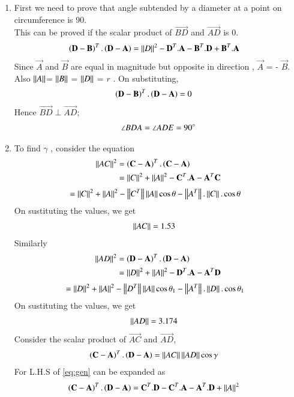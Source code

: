 \renewcommand{\theequation}{\theenumi}
\begin{enumerate}[label=\thesection.\arabic*.,ref=\thesection.\theenumi]

\item First we need to prove that angle subtended by a diameter at a point on circumference is 90\degree. \\
This can be proved if the scalar product of $\vec{BD}$ and $\vec{AD}$ is 0.
\begin{align}
\left(\mathbf{D}-\mathbf{B}\right)^T.\left(\mathbf{D}-\mathbf{A}\right) &= \left\lVert D\right\rVert^2 - \mathbf{D}^T.\mathbf{A} - \mathbf{B}^T.\mathbf{D} + \mathbf{B}^T.\mathbf{A}
\end{align}
Since $\vec{A}$ and $\vec{B}$ are equal in magnitude but opposite in direction , $\vec{A}$ = - $\vec{B}$. Also $\left\lVert A\right\rVert$= $\left\lVert B\right\rVert$ = $\left\lVert D\right\rVert$ = $r$ . On substituting,
\begin{align}
 \left(\mathbf{D}-\mathbf{B}\right)^T.\left(\mathbf{D}-\mathbf{A}\right) &= 0
\end{align}
Hence $\vec{BD} \perp \vec{AD}$; 
\begin{align}
\angle BDA = \angle ADE = 90\degree
\label{eq:angleADE}
\end{align}

\item To find $\gamma$ ,
consider the equation
\begin{align}
\left\lVert AC\right\rVert^2 &=  \left(\mathbf{C} - \mathbf{A}\right)^T. \left(\mathbf{C} - \mathbf{A}\right) \\
 &= \left\lVert C\right\rVert^2 + \left\lVert A\right\rVert^2  - \mathbf{C}^T.\mathbf{A} - \mathbf{A}^T\mathbf{C} 
\end{align}
\begin{align}
 &= \left\lVert C\right\rVert^2 + \left\lVert A\right\rVert^2 - \left\lVert C^T\right\rVert\left\lVert A\right\rVert\cos\theta - \left\lVert A^T\right\rVert.\left\lVert C\right\rVert.\cos\theta
\end{align}
On sustituting the values, we get 
\begin{align}
\left\lVert AC\right\rVert &= 1.53
\label{eq:AC}
\end{align}
Similarly 
\begin{align}
\left\lVert AD\right\rVert^2 &= \left(\mathbf{D} - \mathbf{A}\right)^T.\left(\mathbf{D} - \mathbf{A}\right) \\
 &= \left\lVert D\right\rVert^2 + \left\lVert A\right\rVert^2  - \mathbf{D}^T.\mathbf{A} - \mathbf{A}^T\mathbf{D} 
\end{align}
\begin{align}
 &= \left\lVert D\right\rVert^2 + \left\lVert A\right\rVert^2 - \left\lVert D^T\right\rVert\left\lVert A\right\rVert\cos\theta_1 - \left\lVert A^T\right\rVert.\left\lVert D\right\rVert.\cos\theta_1
\end{align}
On sustituting the values, we get 
\begin{align}
\left\lVert AD\right\rVert &= 3.174
\label{eq:AD}
\end{align}
Consider the scalar product of $\vec{AC}$ and $\vec{AD}$,
\begin{align}
 \left(\mathbf{C} - \mathbf{A}\right)^T.\left(\mathbf{D} - \mathbf{A}\right) &= \left\lVert AC\right\rVert\left\lVert AD\right\rVert\cos\gamma
\label{eq:gen}
\end{align}
For L.H.S of \eqref{eq:gen} can be expanded as
\begin{align}
\left(\mathbf{C} - \mathbf{A}\right)^T.\left(\mathbf{D} - \mathbf{A}\right) &= \mathbf{C}^T.\mathbf{D} - \mathbf{C}^T.\mathbf{A} - \mathbf{A}^T.\mathbf{D} + \left\lVert A\right\rVert^2 
\end{align}


\end{enumerate}
